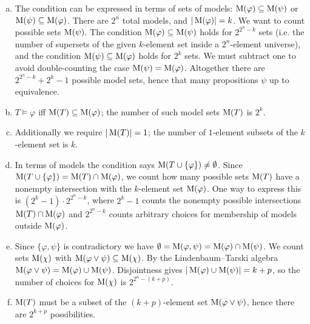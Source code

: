 \begin{problem}
    \begin{solution}
        \begin{enumerate}[(a)]
            \item The condition can be expressed in terms of sets of models: $\operatorname{M}(\varphi)\subseteq\operatorname{M}(\psi)$ or $\operatorname{M}(\psi)\subseteq\operatorname{M}(\varphi)$. There are $2^n$ total models, and $|\operatorname{M}(\varphi)|=k$. We want to count possible sets $\operatorname{M}(\psi)$. The condition $\operatorname{M}(\varphi)\subseteq\operatorname{M}(\psi)$ holds for $2^{2^n-k}$ sets (i.e. the number of supersets of the given $k$-element set inside a $2^n$-element universe), and the condition $\operatorname{M}(\psi)\subseteq\operatorname{M}(\varphi)$ holds for $2^k$ sets. We must subtract one to avoid double-counting the case $\operatorname{M}(\psi)=\operatorname{M}(\varphi)$. Altogether there are $2^{2^n-k}+2^k-1$ possible model sets, hence that many propositions $\psi$ up to equivalence.
            \item $T\models\varphi$ iff $\operatorname{M}(T)\subseteq\operatorname{M}(\varphi)$; the number of such model sets $\operatorname{M}(T)$ is $2^k$.
            \item Additionally we require $|\operatorname{M}(T)|=1$; the number of $1$-element subsets of the $k$-element set is $k$.
            \item In terms of models the condition says $\operatorname{M}(T\cup\{\varphi\})\neq\emptyset$. Since $\operatorname{M}(T\cup\{\varphi\})=\operatorname{M}(T)\cap\operatorname{M}(\varphi)$, we count how many possible sets $\operatorname{M}(T)$ have a nonempty intersection with the $k$-element set $\operatorname{M}(\varphi)$. One way to express this is $(2^k-1)\cdot 2^{2^n-k}$, where $2^k-1$ counts the nonempty possible intersections $\operatorname{M}(T)\cap\operatorname{M}(\varphi)$ and $2^{2^n-k}$ counts arbitrary choices for membership of models outside $\operatorname{M}(\varphi)$.
            \item Since $\{\varphi,\psi\}$ is contradictory we have $\emptyset=\operatorname{M}(\varphi,\psi)=\operatorname{M}(\varphi)\cap\operatorname{M}(\psi)$. We count sets $\operatorname{M}(\chi)$ with $\operatorname{M}(\varphi\lor\psi)\subseteq\operatorname{M}(\chi)$. By the Lindenbaum–Tarski algebra $\operatorname{M}(\varphi\lor\psi)=\operatorname{M}(\varphi)\cup\operatorname{M}(\psi)$. Disjointness gives $|\operatorname{M}(\varphi)\cup\operatorname{M}(\psi)|=k+p$, so the number of choices for $\operatorname{M}(\chi)$ is $2^{2^n-(k+p)}$.
            \item $\operatorname{M}(T)$ must be a subset of the $(k+p)$-element set $\operatorname{M}(\varphi\lor\psi)$, hence there are $2^{k+p}$ possibilities.
        \end{enumerate}
                
    \end{solution}
    
\end{problem}


